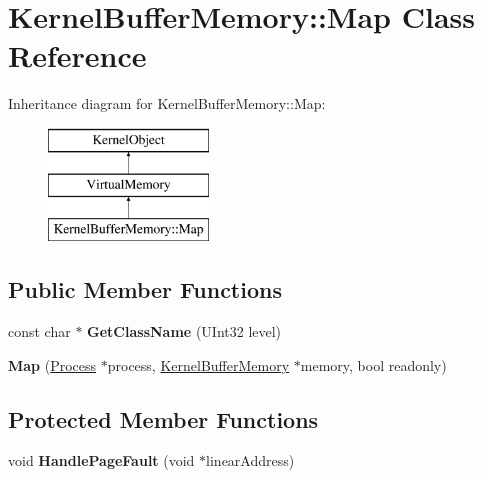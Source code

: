 \hypertarget{class_kernel_buffer_memory_1_1_map}{}\section{Kernel\+Buffer\+Memory\+:\+:Map Class Reference}
\label{class_kernel_buffer_memory_1_1_map}
Inheritance diagram for Kernel\+Buffer\+Memory\+:\+:Map\+:\begin{figure}[H]
\begin{center}
\leavevmode
\includegraphics[height=3.000000cm]{class_kernel_buffer_memory_1_1_map}
\end{center}
\end{figure}
\subsection*{Public Member Functions}
\begin{DoxyCompactItemize}
\item 
\mbox{\label{class_kernel_buffer_memory_1_1_map_a291c8df5c0e47b1813d18d2a74afb4a8}} 
const char $\ast$ {\bfseries Get\+Class\+Name} (U\+Int32 level)
\item 
\mbox{\label{class_kernel_buffer_memory_1_1_map_a8cea00150ddb605f20c7701938cbb947}} 
{\bfseries Map} (\hyperlink{class_process}{Process} $\ast$process, \hyperlink{class_kernel_buffer_memory}{Kernel\+Buffer\+Memory} $\ast$memory, bool readonly)
\end{DoxyCompactItemize}
\subsection*{Protected Member Functions}
\begin{DoxyCompactItemize}
\item 
\mbox{\label{class_kernel_buffer_memory_1_1_map_aacc1181a46e3f5e3285c7d16ad1e7ca5}} 
void {\bfseries Handle\+Page\+Fault} (void $\ast$linear\+Address)
\end{DoxyCompactItemize}
